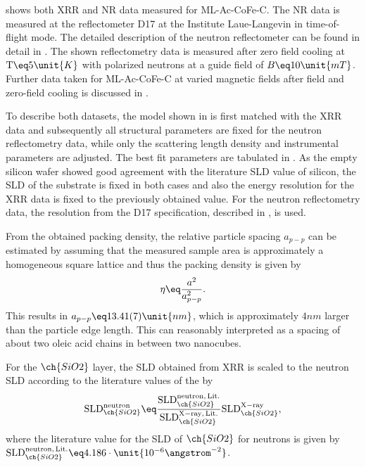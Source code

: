 \documentclass[\main/dresen_thesis.tex]{subfiles}
\begin{document}
   shows both XRR and NR data measured for ML-Ac-CoFe-C.
  The NR data is measured at the reflectometer D17 at the Institute Laue-Langevin in time-of-flight mode.
  The detailed description of the neutron reflectometer can be found in detail in .
  The shown reflectometry data is measured after zero field cooling at $\mathrm{T} \eq 5 \unit{K}$ with polarized neutrons at a guide field of $B \eq 10 \unit{mT}$.
  Further data taken for ML-Ac-CoFe-C at varied magnetic fields after field and zero-field cooling is discussed in .

  To describe both datasets, the model shown in  is first matched with the XRR data and subsequently all structural parameters are fixed for the neutron reflectometry data, while only the scattering length density and instrumental parameters are adjusted.
  The best fit parameters are tabulated in .
  As the empty silicon wafer showed good agreement with the literature SLD value of silicon, the SLD of the substrate is fixed in both cases and also the energy resolution for the XRR data is fixed to the previously obtained value.
  For the neutron reflectometry data, the resolution from the D17 specification, described in \cite{Gutfreund_2018_Towar}, is used.

  From the obtained packing density, the relative particle spacing $a_{p-p}$ can be estimated by assuming that the measured sample area is approximately a homogeneous square lattice and thus the packing density is given by
  \begin{align}
    \eta \eq \frac{a^2}{a_{p-p}^2}.
  \end{align}
  This results in $a_{p-p} \eq 13.41(7) \unit{nm}$, which is approximately $4 \unit{nm}$ larger than the particle edge length.
  This can reasonably interpreted as a spacing of about two oleic acid chains in between two nanocubes.

  For the $\ch{SiO2}$ layer, the SLD obtained from XRR is scaled to the neutron SLD according to the literature values of the  by
  \begin{align}
    \mathrm{SLD}_{\ch{SiO2}}^{\mathrm{neutron} }\eq \frac{\mathrm{SLD}_{\ch{SiO2}}^{\mathrm{neutron, \,Lit.}}}{\mathrm{SLD}_{\ch{SiO2}}^{\mathrm{X-ray, \,Lit.}}} \mathrm{SLD}_{\ch{SiO2}}^{\mathrm{X-ray}},
  \end{align}
  where the literature value for the SLD of $\ch{SiO2}$ for neutrons is given by $\mathrm{SLD}_{\ch{SiO2}}^{\mathrm{neutron, \,Lit.}} \eq 4.186 \cdot \unit{10^{-6} \angstrom^{-2}}$.
\end{document}
